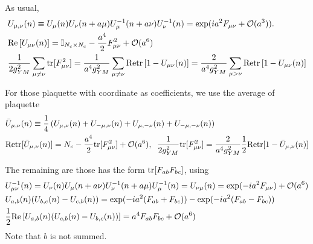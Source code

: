 As usual,
\begin{equation}
\begin{split}
&U_{\mu, \nu}(n)\equiv U_{\mu}(n)U_{\nu}(n+a\mu)U^{-1}_{\mu}(n+a\nu)U^{-1}_{\nu}(n)=\exp (ia^2 F_{\mu\nu}+\mathcal{O}(a^3)).\\
&{\rm Re}\left[U_{\mu \nu}(n)\right]=\mathbb{I}_{N_c\times N_c}-\frac{a^4}{2}F_{\mu\nu}^2+\mathcal{O}(a^6)\\
&\frac{1}{2g_{YM}^2}\sum _{\mu\neq \nu}{\rm tr}[F_{\mu\nu}^2]=\frac{1}{a^4g_{YM}^2}\sum _{\mu\neq \nu}{\rm Retr}\left[1-U_{\mu \nu}(n)\right]=\frac{2}{a^4g_{YM}^2}\sum _{\mu> \nu}{\rm Retr}\left[1-U_{\mu \nu}(n)\right]
\end{split}
\end{equation}

For those plaquette with coordinate as coefficients, we use the average of plaquette
\begin{equation}
\begin{split}
&\bar{U}_{\mu, \nu}(n)\equiv \frac{1}{4}\left(U_{\mu, \nu}(n)+U_{-\mu ,\nu}(n)+U_{\mu, -\nu}(n)+U_{-\mu, -\nu}(n)\right)\\
&{\rm Retr}[\bar{U}_{\mu, \nu}(n)]=N_c-\frac{a^4}{2}{\rm tr}[F_{\mu\nu}^2]+\mathcal{O}(a^6),\;\;\frac{1}{2g_{YM}^2}{\rm tr}[F_{\mu\nu}^2]=\frac{2}{a^4g_{YM}^2}\frac{1}{2}{\rm Retr}[1-\bar{U}_{\mu, \nu}(n)]\\
\end{split}
\end{equation}

The remaining are those has the form ${\rm tr}[F_{ab}F_{bc}]$, using
\begin{equation}
\begin{split}
&U_{\mu\nu}^{-1}(n)=U_{\nu}(n)U_{\mu}(n+a\nu)U^{-1}_{\nu}(n+a\mu)U^{-1}_{\mu}(n)=U_{\nu\mu}(n)=\exp (-ia^2 F_{\mu\nu})+\mathcal{O}(a^6)\\
&U_{a,b}(n)(U_{b,c}(n)-U_{c,b}(n))=\exp (-ia^2 (F_{ab}+F_{bc}))-\exp (-ia^2 (F_{ab}-F_{bc}))\\
&\frac{1}{2}{\rm Re}\left[U_{a,b}(n)(U_{c,b}(n)-U_{b,c}(n))\right]=a^4F_{ab}F_{bc}+\mathcal{O}(a^6)\\
\end{split}
\end{equation}
Note that $b$ is not summed.

